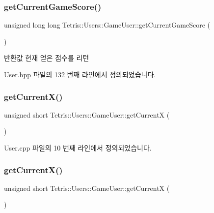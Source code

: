 \subsubsection{\texorpdfstring{get\+Current\+Game\+Score()}{getCurrentGameScore()}}
{\footnotesize\ttfamily unsigned long long Tetris\+::\+Users\+::\+Game\+User\+::get\+Current\+Game\+Score (\begin{DoxyParamCaption}{ }\end{DoxyParamCaption})\hspace{0.3cm}{\ttfamily [inline]}}

\begin{DoxyReturn}{반환값}
현재 얻은 점수를 리턴 
\end{DoxyReturn}


User.\+hpp 파일의 132 번째 라인에서 정의되었습니다.

\mbox{\label{class_tetris_1_1_users_1_1_game_user_ad25eace96bd27ae6df4a0c0d506be730}} 
\subsubsection{\texorpdfstring{get\+Current\+X()}{getCurrentX()}\hspace{0.1cm}{\footnotesize\ttfamily [1/2]}}
{\footnotesize\ttfamily unsigned short Tetris\+::\+Users\+::\+Game\+User\+::get\+CurrentX (\begin{DoxyParamCaption}{ }\end{DoxyParamCaption})}



User.\+cpp 파일의 10 번째 라인에서 정의되었습니다.

\mbox{\label{class_tetris_1_1_users_1_1_game_user_ad25eace96bd27ae6df4a0c0d506be730}} 
\subsubsection{\texorpdfstring{get\+Current\+X()}{getCurrentX()}\hspace{0.1cm}{\footnotesize\ttfamily [2/2]}}
{\footnotesize\ttfamily unsigned short Tetris\+::\+Users\+::\+Game\+User\+::get\+CurrentX (\begin{DoxyParamCaption}{ }\end{DoxyParamCaption})\hspace{0.3cm}{\ttfamily [inline]}}

